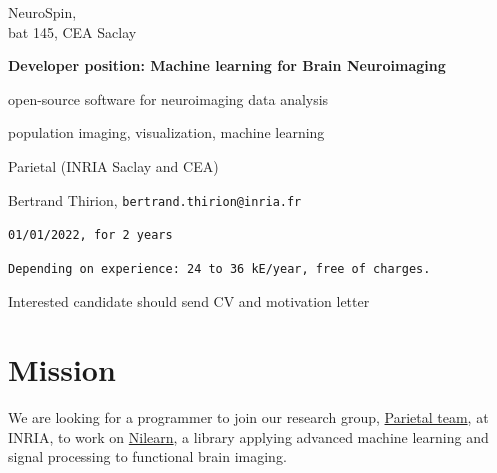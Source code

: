 \documentclass{article}
\def\bsf{\bfseries\sffamily}
\begin{document}
    \hfill%
    \begin{minipage}{.35\linewidth}
    \sf\flushright\vspace*{-1em}
    NeuroSpin, \\
    \small bat 145, CEA Saclay
    \end{minipage}
    \bigskip
    \vspace{5mm}
\centerline{\bsf\Large
Developer position: Machine learning for Brain Neuroimaging
}
\bigskip
\setlength{\parindent}{0pt}%
\enlargethispage{3em}
\hfill%
\begin{minipage}{.9\linewidth}
  \hspace*{-2em}{\bsf Main topic:} open-source software for neuroimaging data analysis
  
\hspace*{-2em}{\bsf Keywords:} population imaging, visualization, machine learning


\hspace*{-2em}{\bsf Research team:} Parietal (INRIA Saclay and CEA)

\hspace*{-2em}{\bsf Contact:} {Bertrand Thirion, {\tt bertrand.thirion@inria.fr}}

\hspace*{-2em}{\bsf Start and duration of contract:} {\tt 01/01/2022, for 2 years}

\hspace*{-2em}{\bsf Salary:} {\tt Depending on experience: 24 to 36 kE/year, free of charges.}

\hspace*{-2em}{\bsf Application:} Interested candidate should send CV and
motivation letter


\end{minipage}

\bigskip

\section*{Mission}

We are looking for a programmer to join our research group, \href{http://team.inria.fr/parietal}{Parietal team}, at INRIA, to work on \href{http://nilearn.github.io}{Nilearn}, a library applying advanced machine learning and signal processing to functional brain imaging.
\end{document}
